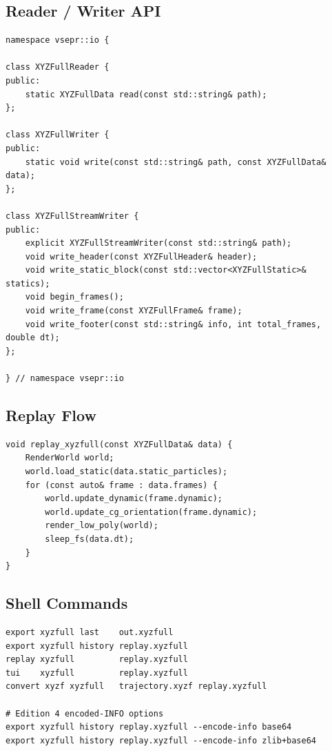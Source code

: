 \documentclass[12pt, a4paper, oneside]{article}
\begin{document}
\subsection{Reader / Writer API}

\begin{lstlisting}
namespace vsepr::io {

class XYZFullReader {
public:
    static XYZFullData read(const std::string& path);
};

class XYZFullWriter {
public:
    static void write(const std::string& path, const XYZFullData& data);
};

class XYZFullStreamWriter {
public:
    explicit XYZFullStreamWriter(const std::string& path);
    void write_header(const XYZFullHeader& header);
    void write_static_block(const std::vector<XYZFullStatic>& statics);
    void begin_frames();
    void write_frame(const XYZFullFrame& frame);
    void write_footer(const std::string& info, int total_frames, double dt);
};

} // namespace vsepr::io
\end{lstlisting}

\subsection{Replay Flow}

\begin{lstlisting}
void replay_xyzfull(const XYZFullData& data) {
    RenderWorld world;
    world.load_static(data.static_particles);
    for (const auto& frame : data.frames) {
        world.update_dynamic(frame.dynamic);
        world.update_cg_orientation(frame.dynamic);
        render_low_poly(world);
        sleep_fs(data.dt);
    }
}
\end{lstlisting}

\subsection{Shell Commands}

\begin{lstlisting}[language={},frame=single]
export xyzfull last    out.xyzfull
export xyzfull history replay.xyzfull
replay xyzfull         replay.xyzfull
tui    xyzfull         replay.xyzfull
convert xyzf xyzfull   trajectory.xyzf replay.xyzfull

# Edition 4 encoded-INFO options
export xyzfull history replay.xyzfull --encode-info base64
export xyzfull history replay.xyzfull --encode-info zlib+base64
\end{lstlisting}
\end{document}
